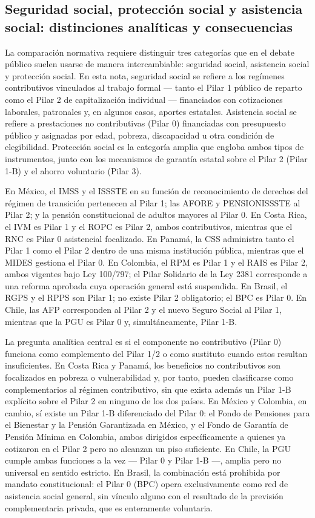 \documentclass[12pt, letterpaper]{article}
\begin{document}
\subsection{Seguridad social, protección social y asistencia social: distinciones analíticas y consecuencias}
\label{sec:sspsas}

La comparación normativa requiere distinguir tres categorías que en el debate público suelen usarse de manera intercambiable: seguridad social, asistencia social y protección social. En esta nota, seguridad social se refiere a los regímenes contributivos vinculados al trabajo formal --- tanto el Pilar 1 público de reparto como el Pilar 2 de capitalización individual --- financiados con cotizaciones laborales, patronales y, en algunos casos, aportes estatales. Asistencia social se refiere a prestaciones no contributivas (Pilar 0) financiadas con presupuesto público y asignadas por edad, pobreza, discapacidad u otra condición de elegibilidad. Protección social es la categoría amplia que engloba ambos tipos de instrumentos, junto con los mecanismos de garantía estatal sobre el Pilar 2 (Pilar 1-B) y el ahorro voluntario (Pilar 3).

En México, el IMSS y el ISSSTE en su función de reconocimiento de derechos del régimen de transición pertenecen al Pilar 1; las AFORE y PENSIONISSSTE al Pilar 2; y la pensión constitucional de adultos mayores al Pilar 0. En Costa Rica, el IVM es Pilar 1 y el ROPC es Pilar 2, ambos contributivos, mientras que el RNC es Pilar 0 asistencial focalizado. En Panamá, la CSS administra tanto el Pilar 1 como el Pilar 2 dentro de una misma institución pública, mientras que el MIDES gestiona el Pilar 0. En Colombia, el RPM es Pilar 1 y el RAIS es Pilar 2, ambos vigentes bajo Ley 100/797; el Pilar Solidario de la Ley 2381 corresponde a una reforma aprobada cuya operación general está suspendida. En Brasil, el RGPS y el RPPS son Pilar 1; no existe Pilar 2 obligatorio; el BPC es Pilar 0. En Chile, las AFP corresponden al Pilar 2 y el nuevo Seguro Social al Pilar 1, mientras que la PGU es Pilar 0 y, simultáneamente, Pilar 1-B.

La pregunta analítica central es si el componente no contributivo (Pilar 0) funciona como complemento del Pilar 1/2 o como sustituto cuando estos resultan insuficientes. En Costa Rica y Panamá, los beneficios no contributivos son focalizados en pobreza o vulnerabilidad y, por tanto, pueden clasificarse como complementarios al régimen contributivo, sin que exista además un Pilar 1-B explícito sobre el Pilar 2 en ninguno de los dos países. En México y Colombia, en cambio, sí existe un Pilar 1-B diferenciado del Pilar 0: el Fondo de Pensiones para el Bienestar y la Pensión Garantizada en México, y el Fondo de Garantía de Pensión Mínima en Colombia, ambos dirigidos específicamente a quienes ya cotizaron en el Pilar 2 pero no alcanzan un piso suficiente. En Chile, la PGU cumple ambas funciones a la vez --- Pilar 0 y Pilar 1-B ---, amplia pero no universal en sentido estricto. En Brasil, la combinación está prohibida por mandato constitucional: el Pilar 0 (BPC) opera exclusivamente como red de asistencia social general, sin vínculo alguno con el resultado de la previsión complementaria privada, que es enteramente voluntaria.
\end{document}
